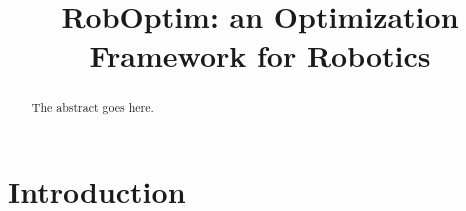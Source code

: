 \documentclass[conference]{IEEEtran}
\begin{document}
\title{RobOptim: an Optimization Framework for Robotics}

\author{
\and
{}
\and
{}
\and
{}
}

\maketitle

\begin{abstract}
\boldmath
The abstract goes here.
\end{abstract}

\IEEEpeerreviewmaketitle

\section{Introduction}
\end{document}
